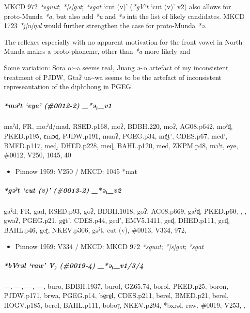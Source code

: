 \documentclass[a4paper,]{article}
\providecommand{\tightlist}{%
  \setlength{\itemsep}{0pt}\setlength{\parskip}{0pt}}
\let\oldsubparagraph\subparagraph
\renewcommand{\subparagraph}[1]{\oldsubparagraph{#1}\mbox{}}
\begin{document}
MKCD 972 \emph{*sguut}; \emph{*{[}s{]}gət}; \emph{*sgat} `cut (v)'
(\emph{*gVˀt} `cut (v)' v2) also allows for proto-Munda \emph{*a}, but
also add \emph{*u} and \emph{*ə} inti the list of likely candidates.
MKCD 1723 \emph{*j{[}n{]}ŋəl} would further strengthen the case for
proto-Munda \emph{*ə}.

The reflexes especially with no apparent motivation for the front vowel
in North Munda makes a proto-phoneme, other than \emph{*a} more likely
and

Some variation: Sora o:\textasciitilde{}a seems real, Juang
ɔ\textasciitilde{}o artefact of my inconsistent treatment of PJDW, Gtaʔ
ua\textasciitilde{}wa seems to be the artefact of inconsistent
represeantation of the diphthong in PGEG.

\subparagraph{\texorpdfstring{\emph{*məˀt} `eye' (\#0012-2)
\_*ə₁\_v1}{*məˀt eye (\#0012-2) \_*ə₁\_v1}}\label{mux259ux2c0t-eye-0012-2-_ux259_v1}

maˀd, FR, mo:ˀd/mad, RSED.p168, moʔ, BDBH.220, moʔ, AG08.p642, moˀɖ,
PKED.p195, ɛmɔɖ, PJDW.p191, muaʔ, PGEG.p34, mẽ̠t', CDES.p67, med',
BMED.p117, meɖ, DHED.p228, meɖ, BAHL.p120, med, ZKPM.p48, məˀt, eye,
\#0012, V250, 1045, 40

\begin{itemize}
\tightlist
\item
  Pinnow 1959: V250 / MKCD: 1045 *mat
\end{itemize}

\subparagraph{\texorpdfstring{\emph{*gəˀt} `cut (v)' (\#0013-2)
\_*ə₁\_v2}{*gəˀt cut (v) (\#0013-2) \_*ə₁\_v2}}\label{gux259ux2c0t-cut-v-0013-2-_ux259_v2}

gaˀd, FR, gad, RSED.p93, goʔ, BDBH.1018, goʔ, AG08.p669, gaˀɖ, PKED.p60,
, , gwaʔ, PGEG.p21, ge̠t', CDES.p44, ged', EMV5.1411, geɖ, DHED.p111,
geɖ, BAHL.p46, geʈ, NKEV.p306, gəˀt, cut (v), \#0013, V334, 972,

\begin{itemize}
\tightlist
\item
  Pinnow 1959: V334 / MKCD: MKCD 972 \emph{*sguut}; \emph{*{[}s{]}gət};
  \emph{*sgat}
\end{itemize}

\subparagraph{\texorpdfstring{\emph{*bVrəl} `raw' V₂ (\#0019-4)
\_*ə₁\_v1/3/4}{*bVrəl raw V₂ (\#0019-4) \_*ə₁\_v1/3/4}}\label{bvrux259l-raw-v-0019-4-_ux259_v134}

---, ---, ---, ---, buro, BDBH.1937, burol, GZ65.74, borol, PKED.p25,
boron, PJDW.p171, brwa, PGEG.p14, be̠re̠l, CDES.p211, berel, BMED.p21,
berel, HOGV.p185, berel, BAHL.p111, boboɽ, NKEV.p294, *bxrəl, raw,
\#0019, V253, ,
\end{document}
